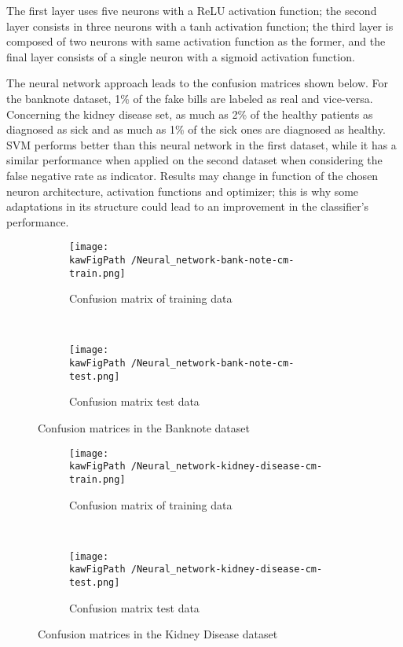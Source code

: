 \documentclass[11pt,a4paper]{article}
\def \kawFigPath {Output/Images}
\begin{document}
The first layer uses five neurons with a ReLU activation function; the second layer consists in three neurons with a tanh activation function; the third layer is composed of two neurons with same activation function as the former, and the final layer consists of a single neuron with a sigmoid activation function. 

The neural network approach leads to the confusion matrices shown below. For the banknote dataset, 1\% of the fake bills are labeled as real and vice-versa. Concerning the kidney disease set, as much as 2\% of the healthy patients as diagnosed as sick and as much as 1\% of the sick ones are diagnosed as healthy. SVM performs better than this neural network in the first dataset, while it has a similar performance when applied on the second dataset when considering the false negative rate as indicator. 
Results may change in function of the chosen neuron architecture, activation functions and optimizer; this is why some adaptations in its structure could lead to an improvement in the classifier's performance. 

\begin{figure}[H]
    \centering
    \begin{subfigure}[b]{0.45\textwidth} %
        \centering \texttt{[image: \\kawFigPath /Neural\_network-bank-note-cm-train.png]}
        \caption{Confusion matrix of training data}\label{ligne_on}
    \end{subfigure}
    ~
    \begin{subfigure}[b]{0.45\textwidth}
        \centering \texttt{[image: \\kawFigPath /Neural\_network-bank-note-cm-test.png]}
        \caption{Confusion matrix test data}\label{ligne_off}
    \end{subfigure}
    \caption{Confusion matrices in the Banknote dataset}\label{figxx}
\end{figure}

\begin{figure}[H]
    \centering
    \begin{subfigure}[b]{0.45\textwidth} %
        \centering \texttt{[image: \\kawFigPath /Neural\_network-kidney-disease-cm-train.png]}
        \caption{Confusion matrix of training data}\label{ligne_on}
    \end{subfigure}
    ~
    \begin{subfigure}[b]{0.45\textwidth}
        \centering \texttt{[image: \\kawFigPath /Neural\_network-kidney-disease-cm-test.png]}
        \caption{Confusion matrix test data}\label{ligne_off}
    \end{subfigure}
    \caption{Confusion matrices in the Kidney Disease dataset}\label{figxx}
\end{figure}
\end{document}
